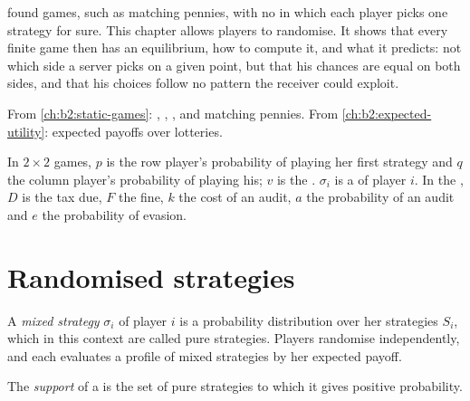  found games, such as matching pennies, with no  in which each
player picks one strategy for sure. This chapter allows players to randomise. It shows that every finite
game then has an equilibrium, how to compute it, and what it predicts: not which side a server picks on a
given point, but that his chances are equal on both sides, and that his choices follow no pattern the
receiver could exploit.

\begin{recall}
From \cref{ch:b2:static-games}: , , , and matching pennies.
From \cref{ch:b2:expected-utility}: expected payoffs over lotteries.
\end{recall}

\begin{notation}\label{not:b2:mixed-strategies:symbols}
In $2 \times 2$ games, $p$ is the row player's probability of playing her first strategy and $q$ the column
player's probability of playing his; $v$ is the . $\sigma_i$ is a  of
player $i$. In the , $D$ is the tax due, $F$ the fine, $k$ the cost of an audit, $a$ the
probability of an audit and $e$ the probability of evasion.
\end{notation}

\section{Randomised strategies}\label{sec:b2:mixed-strategies:randomised}

\begin{definition}\label{def:b2:mixed-strategies:mixed-strategy}
A \emph{mixed strategy} $\sigma_i$ of player $i$ is a probability distribution over her
strategies $S_i$, which in this context are called pure strategies. Players randomise independently, and
each evaluates a profile of mixed strategies by her expected payoff.
\end{definition}

\begin{definition}\label{def:b2:mixed-strategies:support}
The \emph{support} of a  is the set of pure strategies
to which it gives positive probability.
\end{definition}

